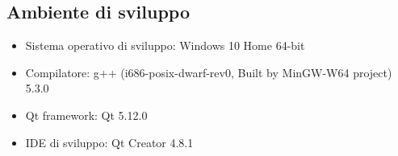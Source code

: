 \subsection{Ambiente di sviluppo} %
\label{sub:ambiente_di_sviluppo}
\begin{itemize}
	\item Sistema operativo di sviluppo: Windows 10 Home 64-bit
	\item Compilatore: g++ (i686-posix-dwarf-rev0, Built by MinGW-W64 project) 5.3.0
	\item Qt framework: Qt 5.12.0
	\item IDE di sviluppo: Qt Creator 4.8.1
\end{itemize}
